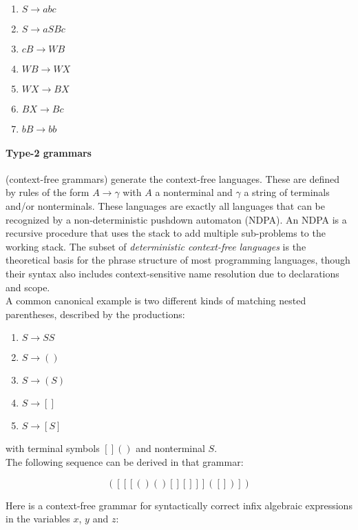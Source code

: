 \documentclass[12pt,b5paper]{book}
\theoremstyle{definition}
\begin{document}
\begin{enumerate}
\item $S \rightarrow a b c$
\item $S \rightarrow a S B c$
\item $c B \rightarrow W B$
\item $W B \rightarrow W X$
\item $W X \rightarrow B X$
\item $B X \rightarrow B c$ 
\item $b B \rightarrow b b$ 
\end{enumerate}


\paragraph{Type-2 grammars} (context-free grammars) generate the context-free languages. These are defined by rules of the form $A \rightarrow \gamma$ with $A$ a nonterminal and $\gamma$ a string of terminals and/or nonterminals. These languages are exactly all languages that can be recognized by a non-deterministic pushdown automaton (NDPA). An NDPA is a recursive procedure that uses the stack to add multiple sub-problems to the working stack. The subset of \textit{deterministic context-free languages} is the theoretical basis for the phrase structure of most programming languages, though their syntax also includes context-sensitive name resolution due to declarations and scope. \\

A common canonical example is two different kinds of matching nested parentheses, described by the productions:

\begin{enumerate}
\item $S \rightarrow SS$
\item $S \rightarrow ()$
\item $S \rightarrow (S)$
\item $S \rightarrow []$
\item $S \rightarrow [S]$
\end{enumerate}

with terminal symbols $[ ] ( )$ and nonterminal $S$. \\

The following sequence can be derived in that grammar:

$$([ [ [ ()() [ ][ ] ] ]([ ]) ])$$


Here is a context-free grammar for syntactically correct infix algebraic expressions in the variables $x$, $y$ and $z$:
\end{document}
